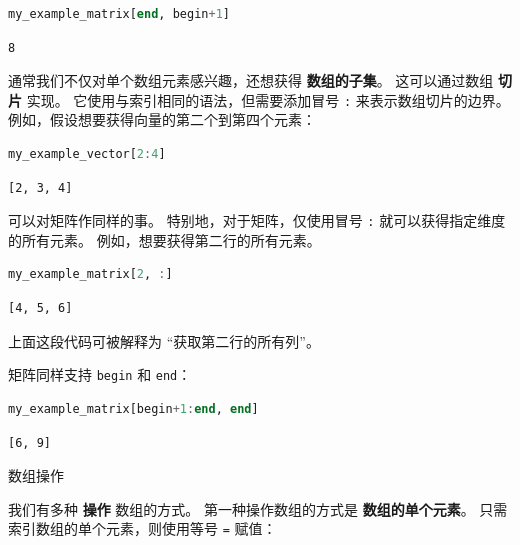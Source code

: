 \documentclass[
  notoc %
]{tufte-book}
\makeatletter
\newcommand{\passthrough}[1]{#1}
\renewcommand\subsubsection{%
\@startsection{subsubsection}{3}{\z@ }{-3.25ex\@plus -1ex \@minus -.2ex}{1.5ex \@plus .2ex}{\normalfont \normalsize \bfseries }
}
\makeatother
\begin{document}
\begin{lstlisting}[language=Julia]
my_example_matrix[end, begin+1]
\end{lstlisting}

\begin{lstlisting}[language=Output]
8
\end{lstlisting}

通常我们不仅对单个数组元素感兴趣，还想获得 \textbf{数组的子集}。
这可以通过数组 \textbf{切片} 实现。
它使用与索引相同的语法，但需要添加冒号 \passthrough{\lstinline!:!}
来表示数组切片的边界。 例如，假设想要获得向量的第二个到第四个元素：

\begin{lstlisting}[language=Julia]
my_example_vector[2:4]
\end{lstlisting}

\begin{lstlisting}[language=Output]
[2, 3, 4]
\end{lstlisting}

可以对矩阵作同样的事。 特别地，对于矩阵，仅使用冒号
\passthrough{\lstinline!:!} 就可以获得指定维度的所有元素。
例如，想要获得第二行的所有元素。

\begin{lstlisting}[language=Julia]
my_example_matrix[2, :]
\end{lstlisting}

\begin{lstlisting}[language=Output]
[4, 5, 6]
\end{lstlisting}

上面这段代码可被解释为 ``获取第二行的所有列''。

矩阵同样支持 \passthrough{\lstinline!begin!} 和
\passthrough{\lstinline!end!}：

\begin{lstlisting}[language=Julia]
my_example_matrix[begin+1:end, end]
\end{lstlisting}

\begin{lstlisting}[language=Output]
[6, 9]
\end{lstlisting}

\hypertarget{sec:array_manipulation}{%
\subsubsection{数组操作}\label{sec:array_manipulation}}

我们有多种 \textbf{操作} 数组的方式。 第一种操作数组的方式是
\textbf{数组的单个元素}。 只需索引数组的单个元素，则使用等号
\passthrough{\lstinline!=!} 赋值：
\end{document}
